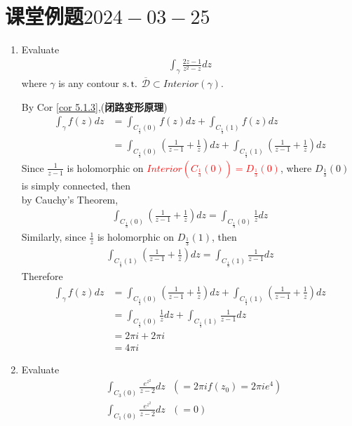\section{课堂例题$2024-03-25$}
\begin{enumerate}
	\item Evaluate 
	\begin{align}
		\int_{\gamma}{\frac{2z - 1}{z^2 - z} dz}
	\end{align}
	where $\gamma$ is any contour $\operatorname{s.t.}$ $\overline{\mathcal{D}} \subset Interior(\gamma)$.
	
	\vspace{2em}
	\begin{solution}
		By Cor \ref{cor 5.1.3},(\textbf{闭路变形原理})
		\begin{align}
			\int_{\gamma}{f(z) dz} 
			&= \int_{C_{\frac{1}{3}}(0)}{f(z) dz} + \int_{C_{\frac{1}{3}}(1)}{f(z) dz} \\
			&= \int_{C_{\frac{1}{3}}(0)}{(\frac{1}{z - 1} + \frac{1}{z}) dz} + \int_{C_{\frac{1}{3}}(1)}{(\frac{1}{z - 1} + \frac{1}{z}) dz}
		\end{align}
		Since $\frac{1}{z - 1}$ is holomorphic on \textcolor{red}{$Interior(C_{\frac{1}{3}}(0)) = D_{\frac{1}{3}}(0)$}, where $D_{\frac{1}{3}}(0)$ is simply connected, then \\
		by Cauchy's Theorem,
		\begin{align}
			\int_{C_{\frac{1}{3}}(0)}{(\frac{1}{z - 1} + \frac{1}{z}) dz} = \int_{C_{\frac{1}{3}}(0)}{\frac{1}{z} dz}
		\end{align}
		Similarly, since $\frac{1}{z}$ is holomorphic on $D_{\frac{1}{3}}(1)$, then
		\begin{align}
			\int_{C_{\frac{1}{3}}(1)}{(\frac{1}{z - 1} + \frac{1}{z}) dz} = \int_{C_{\frac{1}{3}}(1)}{\frac{1}{z - 1} dz}
		\end{align}
		Therefore
		\begin{align}
			\int_{\gamma}{f(z) dz} 
			&= \int_{C_{\frac{1}{3}}(0)}{(\frac{1}{z - 1} + \frac{1}{z}) dz} + \int_{C_{\frac{1}{3}}(1)}{(\frac{1}{z - 1} + \frac{1}{z}) dz} \\
			&= \int_{C_{\frac{1}{3}}(0)}{\frac{1}{z} dz} + \int_{C_{\frac{1}{3}}(1)}{\frac{1}{z - 1} dz} \\
			&= 2\pi i + 2\pi i \\
			&= 4 \pi i
		\end{align}
	\end{solution}
	
	\newpage
	
	\item Evaluate
	\begin{align}
		&\int_{C_{3}(0)}{\frac{e^{z^2}}{z - 2} dz} \,\,\,\, ( = 2 \pi i f(z_0) = 2 \pi i e^4) \\
		&\int_{C_{1}(0)}{\frac{e^{z^2}}{z - 2} dz} \,\,\,\, ( = 0)
	\end{align}
	

\end{enumerate}
